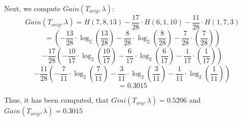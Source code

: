\documentclass{report}
\begin{document}
Next, we compute $Gain(T_{orig}, \lambda)$:
$$Gain(T_{orig}, \lambda) = H(7, 8, 13) - \frac{17}{28} \cdot H(6, 1, 10) - \frac{11}{28} \cdot H(1, 7, 3)$$
$$ = \left(-\frac{13}{28} \cdot \log_2 \left(\frac{13}{28} \right) - \frac{8}{28} \cdot \log_2 \left( \frac{8}{28} \right) - \frac{7}{28} \cdot \left( \frac{7}{28} \right) \right)$$
$$ - \frac{17}{28} \left( - \frac{10}{17} \cdot \log_2 \left( \frac{10}{17} \right) - \frac{6}{17} \cdot \log_2 \left( \frac{6}{17} \right) - \frac{1}{17} \cdot \left( \frac{1}{17} \right) \right)$$
$$ - \frac{11}{28} \left( - \frac{7}{11} \cdot \log_2 \left( \frac{7}{11} \right) - \frac{3}{11} \cdot \log_2 \left( \frac{3}{11} \right) - \frac{1}{11} \cdot \log_2 \left( \frac{1}{11} \right) \right)$$
$$= 0.3015$$

Thus, it has been computed, that $Gini(T_{org}, \lambda) = 0.5206$ and $Gain(T_{orig}, \lambda) = 0.3015$
\end{document}
